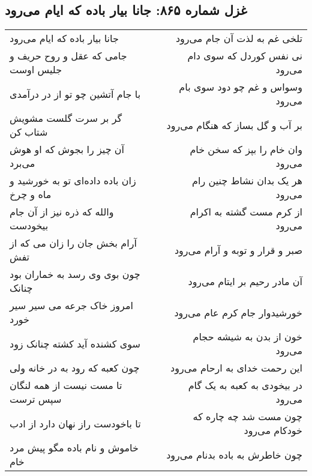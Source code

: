 \begin{center}
\section*{غزل شماره ۸۶۵: جانا بیار باده که ایام می‌رود}
\label{sec:0865}
\begin{longtable}{l p{0.5cm} r}
جانا بیار باده که ایام می‌رود
&&
تلخی غم به لذت آن جام می‌رود
\\
جامی که عقل و روح حریف و جلیس اوست
&&
نی نفس کوردل که سوی دام می‌رود
\\
با جام آتشین چو تو از در درآمدی
&&
وسواس و غم چو دود سوی بام می‌رود
\\
گر بر سرت گلست مشویش شتاب کن
&&
بر آب و گل بساز که هنگام می‌رود
\\
آن چیز را بجوش که او هوش می‌برد
&&
وان خام را بپز که سخن خام می‌رود
\\
زان باده داده‌ای تو به خورشید و ماه و چرخ
&&
هر یک بدان نشاط چنین رام می‌رود
\\
والله که ذره نیز از آن جام بیخودست
&&
از کرم مست گشته به اکرام می‌رود
\\
آرام بخش جان را زان می که از تفش
&&
صبر و قرار و توبه و آرام می‌رود
\\
چون بوی وی رسد به خماران بود چنانک
&&
آن مادر رحیم بر ایتام می‌رود
\\
امروز خاک جرعه می سیر سیر خورد
&&
خورشیدوار جام کرم عام می‌رود
\\
سوی کشنده آید کشته چنانک زود
&&
خون از بدن به شیشه حجام می‌رود
\\
چون کعبه که رود به در خانه ولی
&&
این رحمت خدای به ارحام می‌رود
\\
تا مست نیست از همه لنگان سپس ترست
&&
در بیخودی به کعبه به یک گام می‌رود
\\
تا باخودست راز نهان دارد از ادب
&&
چون مست شد چه چاره که خودکام می‌رود
\\
خاموش و نام باده مگو پیش مرد خام
&&
چون خاطرش به باده بدنام می‌رود
\\
\end{longtable}
\end{center}
